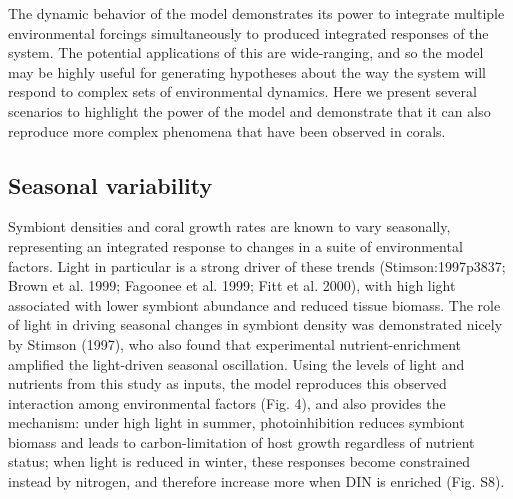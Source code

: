 \documentclass[]{elsarticle} %
\begin{document}
The dynamic behavior of the model demonstrates its power to integrate
multiple environmental forcings simultaneously to produced integrated
responses of the system. The potential applications of this are
wide-ranging, and so the model may be highly useful for generating
hypotheses about the way the system will respond to complex sets of
environmental dynamics. Here we present several scenarios to highlight
the power of the model and demonstrate that it can also reproduce more
complex phenomena that have been observed in corals.

\subsection{Seasonal variability}\label{seasonal-variability}

Symbiont densities and coral growth rates are known to vary seasonally,
representing an integrated response to changes in a suite of
environmental factors. Light in particular is a strong driver of these
trends (Stimson:1997p3837; Brown et al. 1999; Fagoonee et al. 1999; Fitt
et al. 2000), with high light associated with lower symbiont abundance
and reduced tissue biomass. The role of light in driving seasonal
changes in symbiont density was demonstrated nicely by Stimson (1997),
who also found that experimental nutrient-enrichment amplified the
light-driven seasonal oscillation. Using the levels of light and
nutrients from this study as inputs, the model reproduces this observed
interaction among environmental factors (Fig. 4), and also provides the
mechanism: under high light in summer, photoinhibition reduces symbiont
biomass and leads to carbon-limitation of host growth regardless of
nutrient status; when light is reduced in winter, these responses become
constrained instead by nitrogen, and therefore increase more when DIN is
enriched (Fig. S8).
\end{document}
